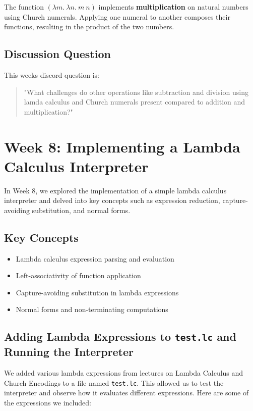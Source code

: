 \documentclass{article}
\begin{document}
The function \((\lambda m.\ \lambda n.\ m\ n)\) implements \textbf{multiplication} on natural numbers using Church numerals. Applying one numeral to another composes their functions, resulting in the product of the two numbers.

\subsection*{Discussion Question}

This weeks discord question is:

\begin{quote}
\small
"What challenges do other operations like subtraction and division using lamda calculus and Church numerals present compared to addition and multiplication?"
\end{quote}

\section{Week 8: Implementing a Lambda Calculus Interpreter}
\label{sec:week8}

In Week 8, we explored the implementation of a simple lambda calculus interpreter and delved into key concepts such as expression reduction, capture-avoiding substitution, and normal forms.

\subsection*{Key Concepts}

\begin{itemize}
    \item Lambda calculus expression parsing and evaluation
    \item Left-associativity of function application
    \item Capture-avoiding substitution in lambda expressions
    \item Normal forms and non-terminating computations
\end{itemize}

\subsection*{Adding Lambda Expressions to \texttt{test.lc} and Running the Interpreter}

We added various lambda expressions from lectures on Lambda Calculus and Church Encodings to a file named \texttt{test.lc}. This allowed us to test the interpreter and observe how it evaluates different expressions. Here are some of the expressions we included:
\end{document}
